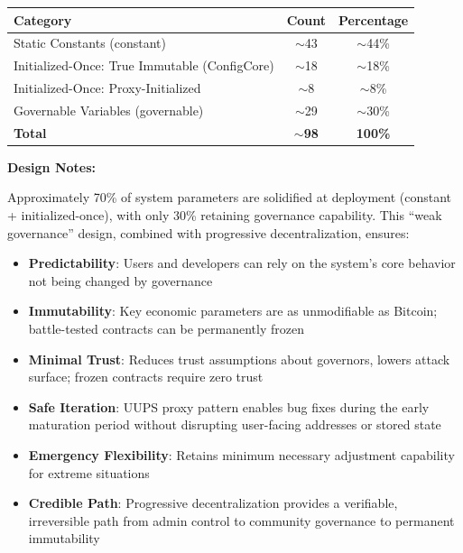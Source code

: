 \documentclass{article}
\begin{document}
\begin{center}
\begin{tabular}{lcc}
\toprule
Category & Count & Percentage \\
\midrule
Static Constants (constant) & $\sim$43 & $\sim$44\% \\
Initialized-Once: True Immutable (ConfigCore) & $\sim$18 & $\sim$18\% \\
Initialized-Once: Proxy-Initialized & $\sim$8 & $\sim$8\% \\
Governable Variables (governable) & $\sim$29 & $\sim$30\% \\
\midrule
\textbf{Total} & \textbf{$\sim$98} & \textbf{100\%} \\
\bottomrule
\end{tabular}
\end{center}

\textbf{Design Notes:}

Approximately 70\% of system parameters are solidified at deployment (constant + initialized-once), with only 30\% retaining governance capability. This ``weak governance'' design, combined with progressive decentralization, ensures:

\begin{itemize}
  \item \textbf{Predictability}: Users and developers can rely on the system's core behavior not being changed by governance
  \item \textbf{Immutability}: Key economic parameters are as unmodifiable as Bitcoin; battle-tested contracts can be permanently frozen
  \item \textbf{Minimal Trust}: Reduces trust assumptions about governors, lowers attack surface; frozen contracts require zero trust
  \item \textbf{Safe Iteration}: UUPS proxy pattern enables bug fixes during the early maturation period without disrupting user-facing addresses or stored state
  \item \textbf{Emergency Flexibility}: Retains minimum necessary adjustment capability for extreme situations
  \item \textbf{Credible Path}: Progressive decentralization provides a verifiable, irreversible path from admin control to community governance to permanent immutability
\end{itemize}
\end{document}
